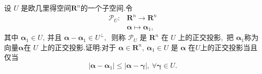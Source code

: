 \begin{problem}
	设 $ U $ 是欧几里得空间$  \mathbf{R}^{n}  $的一个子空间.令
	$$\begin{array}{ll}
		\mathcal{P}_{U}: & \mathbf{R}^{n} \longrightarrow \mathbf{R}^{n} \\
		& \boldsymbol{\alpha} \longmapsto \boldsymbol{\alpha}_{1},\ 
	\end{array}$$
	其中  $\boldsymbol{\alpha}_{1} \in U ,\  $并且 $ \boldsymbol{\alpha}-\boldsymbol{\alpha}_{1} \in U^{\perp} ,\ $ 则称 $ \mathcal{P}_{U} $ 是 $ \mathbf{R}^{n} $ 在 $ U $ 上的正交投影,\  把 $ \boldsymbol{\alpha}_{1}  $称为向量$  \boldsymbol{\alpha}  $在 $ U $ 上的正交投影.证明:对于 $ \boldsymbol{\alpha} \in \mathbf{R}^{n},\  \boldsymbol{\alpha}_{1} \in U $ 是 $ \boldsymbol{\alpha} $ 在$  U  $上的正交投影当且仅当
	$$\left|\boldsymbol{\alpha}-\boldsymbol{\alpha}_{1}\right| \leqslant|\boldsymbol{\alpha}-\boldsymbol{\gamma}|,\  \forall \boldsymbol{\gamma} \in U .$$
\end{problem}
